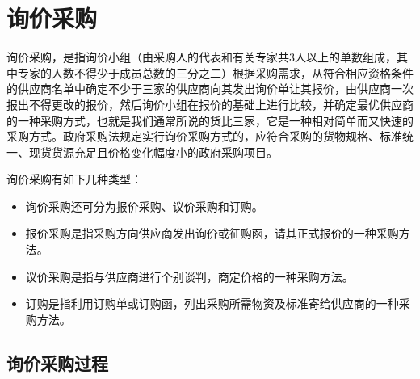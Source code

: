 \section {询价采购}

    询价采购，是指询价小组（由采购人的代表和有关专家共3人以上的单数组成，其中专家的人数不得少于成员总数的三分之二）根据采购需求，从符合相应资格条件的供应商名单中确定不少于三家的供应商向其发出询价单让其报价，由供应商一次报出不得更改的报价，然后询价小组在报价的基础上进行比较，并确定最优供应商的一种采购方式，也就是我们通常所说的货比三家，它是一种相对简单而又快速的采购方式。政府采购法规定实行询价采购方式的，应符合采购的货物规格、标准统一、现货货源充足且价格变化幅度小的政府采购项目。

    询价采购有如下几种类型：
        \begin{itemize}
        \item  询价采购还可分为报价采购、议价采购和订购。
        \item  报价采购是指采购方向供应商发出询价或征购函，请其正式报价的一种采购方法。
        \item  议价采购是指与供应商进行个别谈判，商定价格的一种采购方法。
        \item  订购是指利用订购单或订购函，列出采购所需物资及标准寄给供应商的一种采购方法。
        \end{itemize}

\subsection {询价采购过程}

